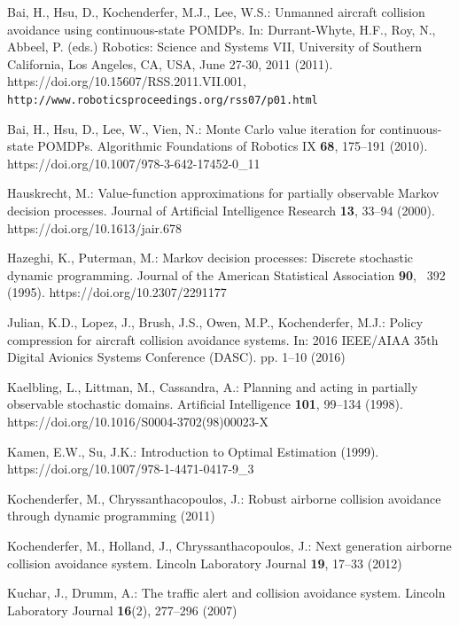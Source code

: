 \documentclass[orivec]{llncs}
\begin{document}
\begin{thebibliography}{10}
\providecommand{\url}[1]{\texttt{#1}}
\providecommand{\urlprefix}{URL }
\providecommand{\doi}[1]{https://doi.org/#1}

Bai, H., Hsu, D., Kochenderfer, M.J., Lee, W.S.: Unmanned aircraft collision
  avoidance using continuous-state {POMDPs}. In: Durrant{-}Whyte, H.F., Roy,
  N., Abbeel, P. (eds.) Robotics: Science and Systems VII, University of
  Southern California, Los Angeles, CA, USA, June 27-30, 2011 (2011).
  \doi{10.15607/RSS.2011.VII.001},
  \url{http://www.roboticsproceedings.org/rss07/p01.html}

Bai, H., Hsu, D., Lee, W., Vien, N.: {Monte Carlo} value iteration for
  continuous-state {POMDPs}. Algorithmic Foundations of Robotics IX
  \textbf{68},  175--191 (2010). \doi{10.1007/978-3-642-17452-0\_11}

Hauskrecht, M.: Value-function approximations for partially observable {Markov}
  decision processes. Journal of Artificial Intelligence Research  \textbf{13},
   33--94 (2000). \doi{10.1613/jair.678}

Hazeghi, K., Puterman, M.: {Markov} decision processes: Discrete stochastic
  dynamic programming. Journal of the American Statistical Association
  \textbf{90}, ~392 (1995). \doi{10.2307/2291177}

Julian, K.D., Lopez, J., Brush, J.S., Owen, M.P., Kochenderfer, M.J.: Policy
  compression for aircraft collision avoidance systems. In: 2016 IEEE/AIAA 35th
  Digital Avionics Systems Conference (DASC). pp. 1--10 (2016)

Kaelbling, L., Littman, M., Cassandra, A.: Planning and acting in partially
  observable stochastic domains. Artificial Intelligence  \textbf{101},
  99--134 (1998). \doi{10.1016/S0004-3702(98)00023-X}

Kamen, E.W., Su, J.K.: Introduction to Optimal Estimation (1999).
  \doi{10.1007/978-1-4471-0417-9\_3}

Kochenderfer, M., Chryssanthacopoulos, J.: Robust airborne collision avoidance
  through dynamic programming (2011)

Kochenderfer, M., Holland, J., Chryssanthacopoulos, J.: Next generation
  airborne collision avoidance system. Lincoln Laboratory Journal  \textbf{19},
   17--33 (2012)

Kuchar, J., Drumm, A.: The traffic alert and collision avoidance system.
  Lincoln Laboratory Journal  \textbf{16}(2),  277--296 (2007)


\end{thebibliography}
\end{document}

